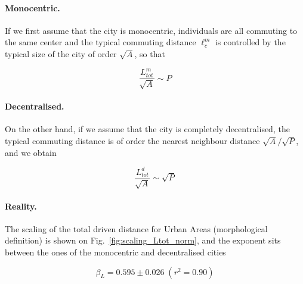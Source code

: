 \paragraph{Monocentric.} If we first assume that the city is monocentric, individuals are all commuting
to the same center and the typical commuting distance $\ell^m_c$ is controlled
by the typical size of the city of order $\sqrt{A}$, so that

\begin{equation} 
    \frac{L_{tot}^{m}}{\sqrt{A}} \sim P 
\end{equation}

\paragraph{Decentralised.} On the other hand, if we assume that the city is completely decentralised, the
typical commuting distance is of order the nearest neighbour distance
$\sqrt{A}/\sqrt{P}$, and we obtain

\begin{equation} 
    \frac{L_{tot}^{d}}{\sqrt{A}} \sim \sqrt{P} 
\end{equation}

\paragraph{Reality. } The scaling of the total driven distance for Urban Areas
(morphological definition) is shown on
Fig.~\ref{fig:scaling_Ltot_norm}, and the exponent sits between the ones of the
monocentric and decentralised cities

\begin{equation*}
    \boxed{\beta_L =  0.595 \pm 0.026\; (r^2 = 0.90)}
\end{equation*}


